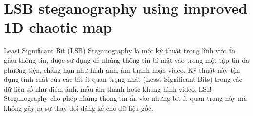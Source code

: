 \chapter{LSB steganography using improved 1D chaotic map}
\label{chapter1}




Least Significant Bit (LSB) Steganography là một kỹ thuật trong lĩnh vực ẩn giấu thông tin, được sử dụng để nhúng thông tin bí mật vào trong một tập tin đa phương tiện, chẳng hạn như hình ảnh, âm thanh hoặc video. Kỹ thuật này tận dụng tính chất của các bit ít quan trọng nhất (Least Significant Bits) trong các dữ liệu số như điểm ảnh, mẫu âm thanh hoặc khung hình video. LSB Steganography cho phép nhúng thông tin ẩn vào những bit ít quan trọng này mà không gây ra sự thay đổi đáng kể cho dữ liệu gốc.

